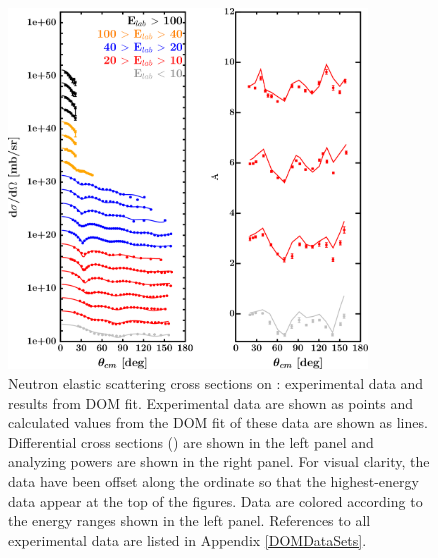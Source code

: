 \begin{figure}[tb]
    \centering
    \includegraphics[width=0.85\textwidth]{figures/ca40_neutronElastic.png}
    \caption[Neutron elastic scattering cross sections on \caForty: DOM predictions and experimental data]
    {
        Neutron elastic scattering cross sections on \caForty: experimental data
        and results from DOM fit. Experimental data are shown as points and
        calculated values from the DOM fit of these data are shown as lines.
        Differential cross sections (\el) are shown in the left panel and
        analyzing powers are shown in the right panel. For visual clarity, the 
        data have been offset along the ordinate so that the highest-energy data
        appear at the top of the figures. Data are colored according to the
        energy ranges shown in the left panel. References to all experimental data are listed
        in Appendix \ref{DOMDataSets}.
    }
    \label{CaNeutronElasticReproduced}
\end{figure}

